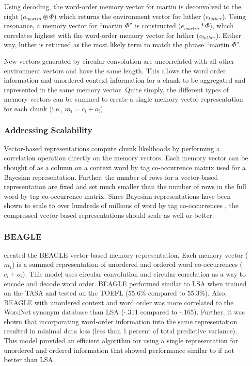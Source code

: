 \documentclass[man,floatsintext,donotrepeattitle]{apa6}
\begin{document}
Using decoding, the word-order memory vector for martin is deconvolved to the right ($o_{martin} \circledast \Phi$) which returns the environment vector for luther ($e_{luther}$).
Using resonance, a memory vector for ``martin $\Phi$'' is constructed ($e_{martin} * \Phi$), which correlates highest with the word-order memory vector for luther ($o_{luther}$).
Either way, luther is returned as the most likely term to match the phrase ``martin $\Phi$''.

New vectors generated by circular convolution are uncorrelated with all other environment vectors and have the same length.
This allows the word order information and unordered context information for a chunk to be aggregated and represented in the same memory vector.
Quite simply, the different types of memory vectors can be summed to create a single memory vector representation for each chunk (i.e., $m_{i} = c_{i} + o_{i}$).

\subsubsection{Addressing Scalability}

Vector-based representations compute chunk likelihoods by performing a correlation operation directly on the memory vectors.
Each memory vector can be thought of as a column on a context word by tag co-occurrence matrix used for a Bayesian representation.
Further, the number of rows for a vector-based representation are fixed and set much smaller than the number of rows in the full word by tag co-occurrence matrix.
Since Bayesian representations have been shown to scale to over hundreds of millions of word by tag co-occurrences \parencite{Stanley2013}, the compressed vector-based representations should scale as well or better.

\subsubsection{BEAGLE}

\textcite{Jones2007} created the BEAGLE vector-based memory representation.
Each memory vector ($m_{i}$) is a summed representation of unordered and ordered word co-occurrences ($c_{i} + o_{i}$).
This model uses circular convolution and circular correlation as a way to encode and decode word order.
BEAGLE performed similar to LSA when trained on the TASA and tested on the TOEFL (55.6\% compared to 55.3\%).
Also, BEAGLE with unordered context and word order was more correlated to the WordNet synonym database than LSA (-.311 compared to -.165).
Further, it was shown that incorporating word-order information into the same representation resulted in minimal data loss (less than 1 percent of total predictive variance).
This model provided an efficient algorithm for using a single representation for unordered and ordered information that showed performance similar to if not better than LSA.
\end{document}
